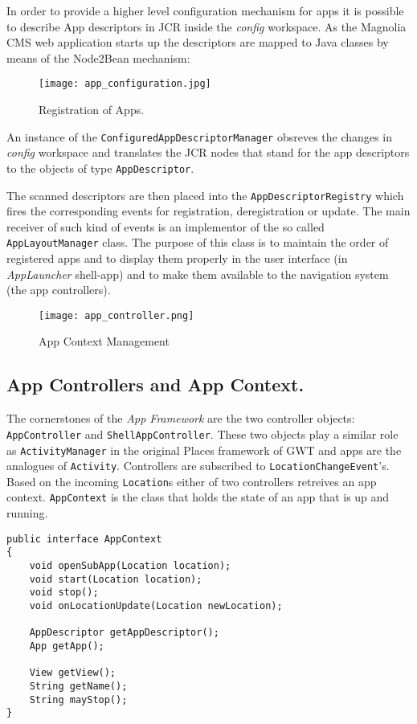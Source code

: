 In order to provide a higher level configuration mechanism for apps it is
possible to describe App descriptors in JCR inside the \emph{config} workspace.
As the Magnolia CMS web application starts up the descriptors are mapped to Java
classes by means of the Node2Bean mechanism:

\begin{figure}[H] \centering \texttt{[image: app\_configuration.jpg]}
	\caption{Registration of Apps.}
	\label{fig:app_registry}
\end{figure}

An instance of the \texttt{ConfiguredAppDescriptorManager} obsreves the changes 
in \emph{config} workspace and translates the JCR nodes that stand for the app descriptors to 
the objects of type \texttt{AppDescriptor}.

The scanned descriptors are then placed into the \texttt{AppDescriptorRegistry}
which fires the corresponding events for registration, deregistration or update.
The main receiver of such kind of events is an implementor of the so called
\texttt{AppLayoutManager} class. The purpose of this class is to maintain the
order of registered apps and to display them properly in the user interface (in
\emph{AppLauncher} shell-app) and to make them available to the navigation
system (the app controllers).

\begin{figure}[H] \centering \texttt{[image: app\_controller.png]}
	\caption{App Context Management}
	\label{fig:app_context}
\end{figure}

\subsection{App Controllers and App Context.} The cornerstones of the \emph{App Framework} are the two
controller objects: \texttt{AppController} and \texttt{ShellAppController}.
These two objects play a similar role as \texttt{ActivityManager} in the original 
Places framework of GWT and apps are the analogues of \texttt{Activity}.
Controllers are subscribed to \texttt{LocationChangeEvent}'s. Based on the
incoming \texttt{Location}s either of two controllers retreives an app context.
\texttt{AppContext} is the class that holds the state of an app that is up and
running.

\begin{lstlisting}
public interface AppContext 
{
    void openSubApp(Location location);
    void start(Location location);
    void stop();
    void onLocationUpdate(Location newLocation);
    
    AppDescriptor getAppDescriptor();
    App getApp();
    
    View getView();
    String getName();    
    String mayStop();
}
\end{lstlisting}

